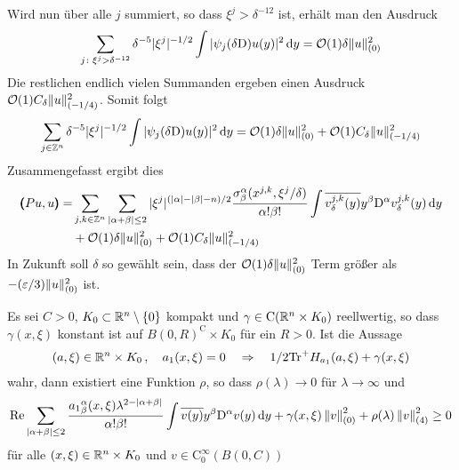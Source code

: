 Wird nun über alle $j$ summiert, so dass $\xi^j>\delta^{-12}$ ist, erhält man den Ausdruck
\begin{align*}
\sum_{j\colon \xi^j>\delta^{-12}} \delta^{-5} |\xi^j|^{-1/2}\int |\psi_j(\delta\mathrm D)u(y)|^2\,\mathrm d y = \mathcal O(1)\delta\lVert u\rVert _{(0)}^2
\end{align*}
Die restlichen endlich vielen Summanden ergeben einen Ausdruck $\mathcal O(1)C_\delta \lVert u\rVert _{(-1/4)}^2$. Somit folgt
\begin{align*}
\sum_{j\in\mathbb Z^n}\delta^{-5} |\xi^j|^{-1/2}\int |\psi_j(\delta\mathrm D)u(y)|^2\,\mathrm d y = \mathcal O(1)\delta\lVert u\rVert _{(0)}^2 + \mathcal O(1)C_\delta \lVert u\rVert _{(-1/4)}^2
\end{align*}
Zusammengefasst ergibt dies
\begin{align*}
\pmb(Pu,u\pmb)
=& \sum_{j,k\in\mathbb Z^n}\sum_{\lvert\alpha+\beta\rvert\le 2}|\xi^j|^{(\lvert\alpha\rvert-\lvert\beta\rvert-n)/2} \frac{\sigma^\alpha_\beta(x^{j,k},\xi^j/\delta)}{\alpha!\beta!}\int\overline{v^{j,k}_\delta(y)}y^\beta\mathrm D^\alpha v^{j,k}_\delta(y)\,\mathrm d y\\
&+\mathcal O(1)\delta\lVert u\rVert _{(0)}^2 + \mathcal O(1)C_\delta \lVert u\rVert _{(-1/4)}^2\nonumber
\end{align*}
In Zukunft soll $\delta$ so gewählt sein, dass der $\mathcal O(1)\delta\lVert u\rVert ^2_{(0)}$ Term größer als $-(\varepsilon/3)\lVert u\rVert ^2_{(0)}$ ist.

\begin{lem}
Es sei $C>0$, $K_0\subset\mathbb R^n\setminus\{0\}$ kompakt und $\gamma\in\mathrm C(\mathbb R^n\times K_0)$ reellwertig, so dass $\gamma(x,\xi)$ konstant ist auf $B(0,R)^\mathrm{C}\times K_0$ für ein $R>0$. Ist die Aussage
\begin{align}\label{melinendlemma1}
(a,\xi)\in\mathbb R^n\times K_0\,,\quad a_1(x,\xi)=0 \quad \Rightarrow \quad 1/2 \mathrm{Tr}^+H_{a_1}(a,\xi) + \gamma(x,\xi)
\end{align}
wahr, dann existiert eine Funktion $\rho$, so dass $\rho(\lambda)\to 0$ für $\lambda\to\infty$ und
\begin{align}\label{melinendlemma2}
\operatorname{Re} \sum_{|\alpha+\beta|\le 2} \frac{{a_1}^\alpha_\beta(x,\xi)\lambda^{2-|\alpha+\beta|}}{\alpha!\beta!}\int\overline{v(y)}y^\beta\mathrm D^\alpha v(y)\,\mathrm d y + \gamma(x,\xi)\left\lVert v\right\rVert_{(0)}^2 + \rho(\lambda)\left\lVert v\right\rVert _{(4)}^2 \ge 0
\end{align}
für alle $(x,\xi)\in\mathbb R^n\times K_0$ und $v\in\mathrm C^\infty_0(B(0,C))$
\end{lem}


